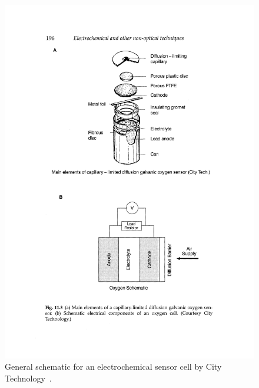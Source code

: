 \begin{figure}[htpb]
    \centering
    \includegraphics[trim=6cm 6.2cm 4cm 16cm, clip]{img/pdf/clark_193.pdf}
    \caption{General schematic for an electrochemical sensor cell by
    City Technology~\cite{Clark1997}.}%
    \label{fig:electrochemical_wet_cell}
\end{figure}

